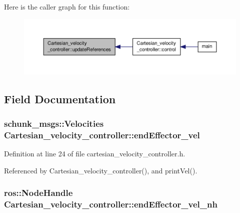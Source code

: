 Here is the caller graph for this function\-:\nopagebreak
\begin{figure}[H]
\begin{center}
\leavevmode
\includegraphics[width=350pt]{classCartesian__velocity__controller_a9b2c7f25b3fc2882f7e4590ee97e0978_icgraph}
\end{center}
\end{figure}




\subsection{Field Documentation}
\hypertarget{classCartesian__velocity__controller_ae771d963a90ad7b844c4c3a821ce5f39}{
\subsubsection[{end\-Effector\-\_\-vel}]{\setlength{\rightskip}{0pt plus 5cm}schunk\-\_\-msgs\-::\-Velocities Cartesian\-\_\-velocity\-\_\-controller\-::end\-Effector\-\_\-vel\hspace{0.3cm}{\ttfamily [protected]}}}\label{classCartesian__velocity__controller_ae771d963a90ad7b844c4c3a821ce5f39}


Definition at line 24 of file cartesian\-\_\-velocity\-\_\-controller.\-h.



Referenced by Cartesian\-\_\-velocity\-\_\-controller(), and print\-Vel().

\hypertarget{classCartesian__velocity__controller_a01cbe7f951c69ded8604e552a0a706e0}{
\subsubsection[{end\-Effector\-\_\-vel\-\_\-nh}]{\setlength{\rightskip}{0pt plus 5cm}ros\-::\-Node\-Handle Cartesian\-\_\-velocity\-\_\-controller\-::end\-Effector\-\_\-vel\-\_\-nh\hspace{0.3cm}{\ttfamily [protected]}}}\label{classCartesian__velocity__controller_a01cbe7f951c69ded8604e552a0a706e0}


